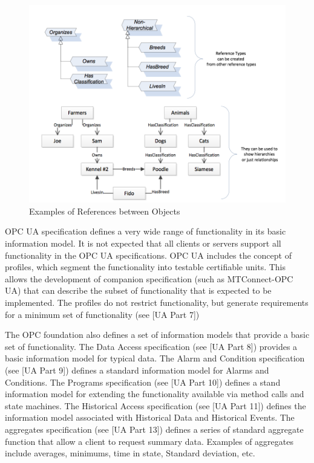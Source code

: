 \begin{figure}[h]
  \centering
  \includegraphics[width=1.0\textwidth]{diagrams/RefsBetweenObjects.png}
  \caption{Examples of References between Objects}
  \label{fig:ref_bet_objs}
\end{figure}

OPC UA specification defines a very wide range of functionality in its basic information model. It is not expected that all clients or servers support all functionality in the OPC UA specifications. OPC UA includes the concept of profiles, which segment the functionality into testable certifiable units. This allows the development of companion specification (such as MTConnect-OPC UA) that can describe the subset of functionality that is expected to be implemented. The profiles do not restrict functionality, but generate requirements for a minimum set of functionality (see [UA Part 7])

The OPC foundation also defines a set of information models that provide a basic set of functionality. The Data Access specification (see [UA Part 8]) provides a basic information model for typical data. The Alarm and Condition specification (see [UA Part 9]) defines a standard information model for Alarms and Conditions. The Programs specification (see [UA Part 10]) defines a stand information model for extending the functionality available via method calls and state machines. The Historical Access specification (see [UA Part 11]) defines the information model associated with Historical Data and Historical Events. The aggregates specification (see [UA Part 13]) defines a series of standard aggregate function that allow a client to request summary data. Examples of aggregates include averages, minimums, time in state, Standard deviation, etc. 

